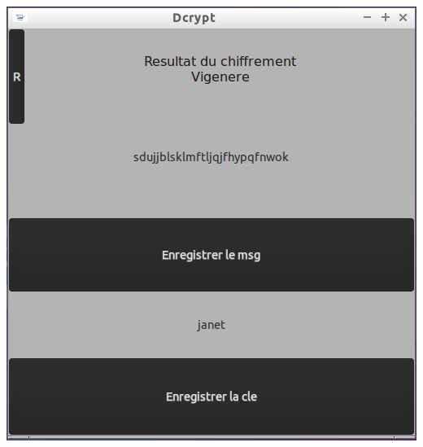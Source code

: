 \documentclass[a4]{article}
\begin{document}
			\begin{center}\includegraphics[scale=0.4]{7.png}\end{center}
		
		
\end{document}
